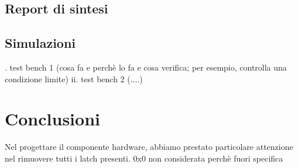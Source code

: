 \documentclass[12pt, table, xcdraw]{article}
\begin{document}
\subsection{Report di sintesi}
\subsection{Simulazioni}
. test bench 1 (cosa fa e perchè lo fa e cosa verifica; per esempio,
controlla una condizione limite)
ii. test bench 2 (....)

\newpage
\section{Conclusioni}
Nel progettare il componente hardware, abbiamo prestato particolare attenzione nel rimuovere tutti i latch presenti.
0x0 non considerata perchè fuori specifica
\end{document}
